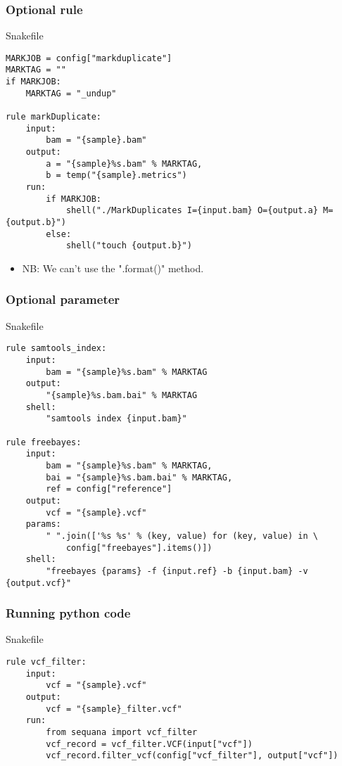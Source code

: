 \documentclass{beamer}
\begin{document}
\begin{frame}[fragile]
    \frametitle{Optional rule}
    \begin{block}{Snakefile}
        \begin{lstlisting}
MARKJOB = config["markduplicate"]
MARKTAG = ""
if MARKJOB:
    MARKTAG = "_undup"

rule markDuplicate:
    input:
        bam = "{sample}.bam"
    output:
        a = "{sample}%s.bam" % MARKTAG,
        b = temp("{sample}.metrics")
    run:
        if MARKJOB:
            shell("./MarkDuplicates I={input.bam} O={output.a} M={output.b}")
        else:
            shell("touch {output.b}")
        \end{lstlisting}
    \end{block}
    \begin{itemize}
        \item NB: We can't use the ".format()" method.
    \end{itemize}
\end{frame}

\begin{frame}[fragile]
    \frametitle{Optional parameter}
    \begin{block}{Snakefile}
        \begin{lstlisting}
rule samtools_index:
    input: 
        bam = "{sample}%s.bam" % MARKTAG
    output:
        "{sample}%s.bam.bai" % MARKTAG
    shell:
        "samtools index {input.bam}"

rule freebayes:
    input:
        bam = "{sample}%s.bam" % MARKTAG,
        bai = "{sample}%s.bam.bai" % MARKTAG,
        ref = config["reference"]
    output:
        vcf = "{sample}.vcf"
    params:
        " ".join(['%s %s' % (key, value) for (key, value) in \
            config["freebayes"].items()])
    shell:
        "freebayes {params} -f {input.ref} -b {input.bam} -v {output.vcf}"
        \end{lstlisting}
    \end{block}
\end{frame}

\begin{frame}[fragile]
    \frametitle{Running python code}
    \begin{block}{Snakefile}
        \begin{lstlisting}
rule vcf_filter:
    input:
        vcf = "{sample}.vcf"
    output:
        vcf = "{sample}_filter.vcf"
    run:
        from sequana import vcf_filter
        vcf_record = vcf_filter.VCF(input["vcf"])
        vcf_record.filter_vcf(config["vcf_filter"], output["vcf"])
        \end{lstlisting}
    \end{block}
\end{frame}
\end{document}
